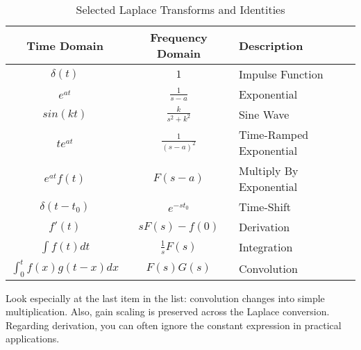 \begin{table}[h]
\centering
\begin{tabular}{c|c|l}
Time Domain & Frequency Domain & Description \\
\hline
$\delta (t)$ & $1$ & Impulse Function\\
$e^{at}$ & $\frac{1}{s-a}$ & Exponential \\
$sin(kt)$ & $\frac{k}{s^2+k^2}$ & Sine Wave\\
$te^{at}$ & $\frac{1}{(s-a)^2}$ & Time-Ramped Exponential\\
$e^{at}f(t)$ & $F(s-a)$ & Multiply By Exponential\\
$\delta(t-t_0)$ & $e^{-st_0}$ & Time-Shift\\
$f'(t)$ & $sF(s) - f(0)$ & Derivation\\
$\int f(t)dt$ & $\frac{1}{s}F(s)$ & Integration\\
$\int^t_0 f(x)g(t-x)dx$ & $F(s)G(s)$ & Convolution\\

\end{tabular}
\caption{Selected Laplace Transforms and Identities}\label{laplace_list}
\end{table}

Look especially at the last item in the list: convolution changes into simple multiplication. Also, gain scaling is preserved across the Laplace conversion. Regarding derivation, you can often ignore the constant expression in practical applications.